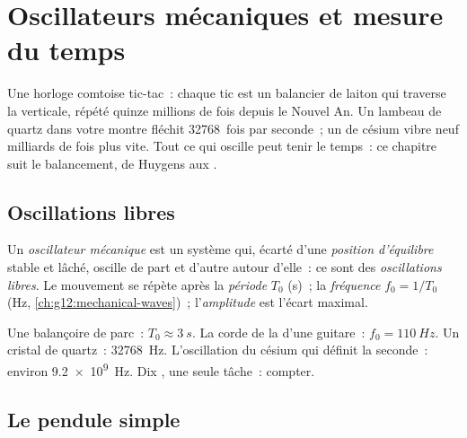 \chapter{Oscillateurs mécaniques et mesure du temps}\label{ch:g12:oscillators-and-time}

Une horloge comtoise tic-tac~: chaque tic est un balancier de laiton
qui traverse la verticale, répété quinze millions de fois depuis le
Nouvel An. Un lambeau de quartz dans votre montre fléchit
\num{32768}~fois par seconde~; un  de césium
vibre neuf milliards de fois plus vite. Tout ce qui oscille peut
tenir le temps~: ce chapitre suit le balancement, de Huygens aux
.

\section{Oscillations libres}

\begin{definition}\label{def:g12:oscillators-and-time:oscillator}
Un \emph{oscillateur mécanique} est un système qui,
écarté d'une \emph{position d'équilibre} stable et lâché, oscille de part et d'autre autour d'elle~: ce
sont des \emph{oscillations libres}. Le
mouvement se répète après la \emph{période} $T_0$
(\unit{s})~; la \emph{fréquence} $f_0 = 1/T_0$
(\unit{Hz}, \cref{ch:g12:mechanical-waves})~; l'\emph{amplitude}%
 est l'écart maximal.
\end{definition}

\begin{example}\label{ex:g12:oscillators-and-time:zoo}
Une balançoire de parc~: $T_0 \approx \qty{3}{s}$. La corde de la
d'une guitare~: $f_0 = \qty{110}{Hz}$. Un cristal de quartz~:
\qty{32768}{Hz}. L'oscillation du césium qui définit la seconde~:
environ \qty{9.2e9}{Hz}. Dix , une seule tâche~:
compter.
\end{example}

\section{Le pendule simple}


